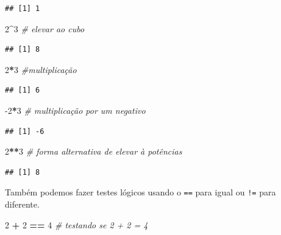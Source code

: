 \documentclass[
]{article}
\newenvironment{Shaded}{\begin{snugshade}}{\end{snugshade}}
\newcommand{\CommentTok}[1]{\textcolor[rgb]{0.56,0.35,0.01}{\textit{#1}}}
\newcommand{\DecValTok}[1]{\textcolor[rgb]{0.00,0.00,0.81}{#1}}
\newcommand{\OperatorTok}[1]{\textcolor[rgb]{0.81,0.36,0.00}{\textbf{#1}}}
\newcommand{\StringTok}[1]{\textcolor[rgb]{0.31,0.60,0.02}{#1}}
\begin{document}
\begin{verbatim}
## [1] 1
\end{verbatim}

\begin{Shaded}
\begin{Highlighting}[]
\DecValTok{2}\OperatorTok{^}\DecValTok{3} \CommentTok{# elevar ao cubo}
\end{Highlighting}
\end{Shaded}

\begin{verbatim}
## [1] 8
\end{verbatim}

\begin{Shaded}
\begin{Highlighting}[]
\DecValTok{2}\OperatorTok{*}\DecValTok{3} \CommentTok{#multiplicação}
\end{Highlighting}
\end{Shaded}

\begin{verbatim}
## [1] 6
\end{verbatim}

\begin{Shaded}
\begin{Highlighting}[]
\DecValTok{-2}\OperatorTok{*}\DecValTok{3} \CommentTok{# multiplicação por um negativo}
\end{Highlighting}
\end{Shaded}

\begin{verbatim}
## [1] -6
\end{verbatim}

\begin{Shaded}
\begin{Highlighting}[]
\DecValTok{2}\OperatorTok{**}\DecValTok{3} \CommentTok{# forma alternativa de elevar à potências}
\end{Highlighting}
\end{Shaded}

\begin{verbatim}
## [1] 8
\end{verbatim}

Também podemos fazer testes lógicos usando o \texttt{==} para igual ou
\texttt{!=} para diferente.

\begin{Shaded}
\begin{Highlighting}[]
\DecValTok{2} \OperatorTok{+}\StringTok{ }\DecValTok{2} \OperatorTok{==}\StringTok{ }\DecValTok{4} \CommentTok{# testando se 2 + 2 = 4}
\end{Highlighting}
\end{Shaded}
\end{document}

